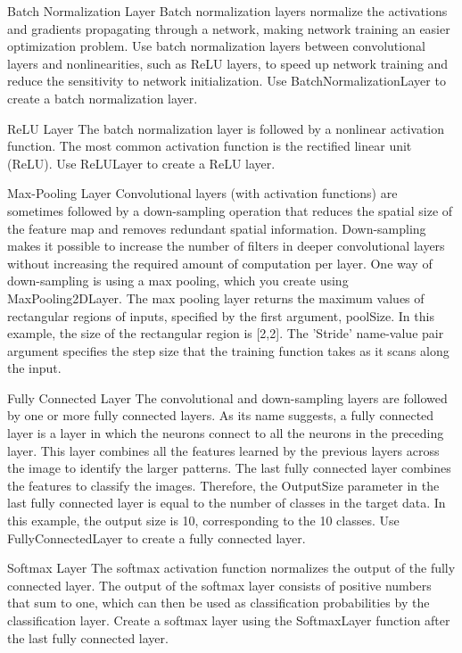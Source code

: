 Batch Normalization Layer Batch normalization layers normalize the activations and gradients propagating through a network, making network training an easier optimization problem. Use batch normalization layers between convolutional layers and nonlinearities, such as ReLU layers, to speed up network training and reduce the sensitivity to network initialization. Use BatchNormalizationLayer to create a batch normalization layer.

ReLU Layer The batch normalization layer is followed by a nonlinear activation function. The most common activation function is the rectified linear unit (ReLU). Use ReLULayer to create a ReLU layer.

Max-Pooling Layer Convolutional layers (with activation functions) are sometimes followed by a down-sampling operation that reduces the spatial size of the feature map and removes redundant spatial information. Down-sampling makes it possible to increase the number of filters in deeper convolutional layers without increasing the required amount of computation per layer. One way of down-sampling is using a max pooling, which you create using MaxPooling2DLayer. The max pooling layer returns the maximum values of rectangular regions of inputs, specified by the first argument, poolSize. In this example, the size of the rectangular region is [2,2]. The 'Stride' name-value pair argument specifies the step size that the training function takes as it scans along the input.

Fully Connected Layer The convolutional and down-sampling layers are followed by one or more fully connected layers. As its name suggests, a fully connected layer is a layer in which the neurons connect to all the neurons in the preceding layer. This layer combines all the features learned by the previous layers across the image to identify the larger patterns. The last fully connected layer combines the features to classify the images. Therefore, the OutputSize parameter in the last fully connected layer is equal to the number of classes in the target data. In this example, the output size is 10, corresponding to the 10 classes. Use FullyConnectedLayer to create a fully connected layer.

Softmax Layer The softmax activation function normalizes the output of the fully connected layer. The output of the softmax layer consists of positive numbers that sum to one, which can then be used as classification probabilities by the classification layer. Create a softmax layer using the SoftmaxLayer function after the last fully connected layer.


